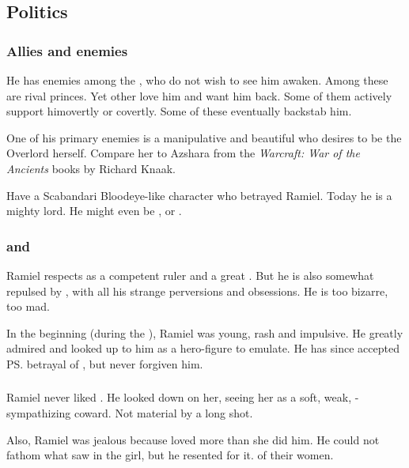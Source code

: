 \subsection{Politics}
\subsubsection{Allies and enemies}
He has enemies among the \resphain, who do not wish to see him awaken. Among these are rival \Mystraacht{} princes. Yet other \resphain{} love him and want him back. Some of them actively support him\dash overtly or covertly. Some of these eventually backstab him. 

One of his primary enemies is a manipulative and beautiful \resvil{} who desires to be the \Mystraacht{} Overlord herself. Compare her to Azshara from the \emph{Warcraft: War of the Ancients} books by Richard Knaak. 

Have a Scabandari Bloodeye-like character who betrayed Ramiel. Today he is a mighty \resphan{} lord. 
He might even be \Teshrial, or \Azraid. 





\subsubsection{\Azraid{} and \Damiarch}
Ramiel respects \Azraid{} as a competent ruler and a great \resphan. But he is also somewhat repulsed by \Azraid, with all his strange perversions and obsessions. He is too bizarre, too mad.

In the beginning (during the ), Ramiel was young, rash and impulsive. 
He greatly admired \Damiarch{} and looked up to him as a hero-figure to emulate. 
He has since accepted \ps{\Azraid}{} betrayal of \Damiarch, but never forgiven him. 




\subsubsection{\Eryal}
Ramiel never liked \Eryal. 
He looked down on her, seeing her as a soft, weak, \Merkyrah-sympathizing coward. 
Not \Mystraacht{} material by a long shot. 

Also, Ramiel was jealous because \Shiaraid{} loved \Eryal{} more than she did him. 
He could not fathom what \Shiaraid{} saw in the girl, but he resented \Eryal{} for it. 
 of their women. 





